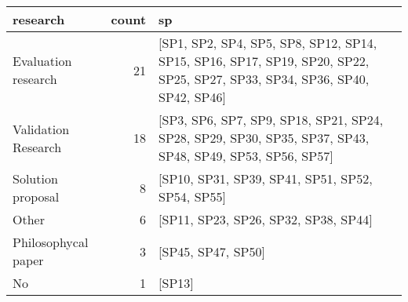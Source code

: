 \begin{tabular}{lrl}
\toprule
            research &  count &                                                                                                                         sp \\
\midrule
 Evaluation research &     21 &  [SP1, SP2, SP4, SP5, SP8, SP12, SP14, SP15, SP16, SP17, SP19, SP20, SP22, SP25, SP27, SP33, SP34, SP36, SP40, SP42, SP46] \\
 Validation Research &     18 &                   [SP3, SP6, SP7, SP9, SP18, SP21, SP24, SP28, SP29, SP30, SP35, SP37, SP43, SP48, SP49, SP53, SP56, SP57] \\
   Solution proposal &      8 &                                                                           [SP10, SP31, SP39, SP41, SP51, SP52, SP54, SP55] \\
               Other &      6 &                                                                                       [SP11, SP23, SP26, SP32, SP38, SP44] \\
 Philosophycal paper &      3 &                                                                                                         [SP45, SP47, SP50] \\
                  No &      1 &                                                                                                                     [SP13] \\
\bottomrule
\end{tabular}
